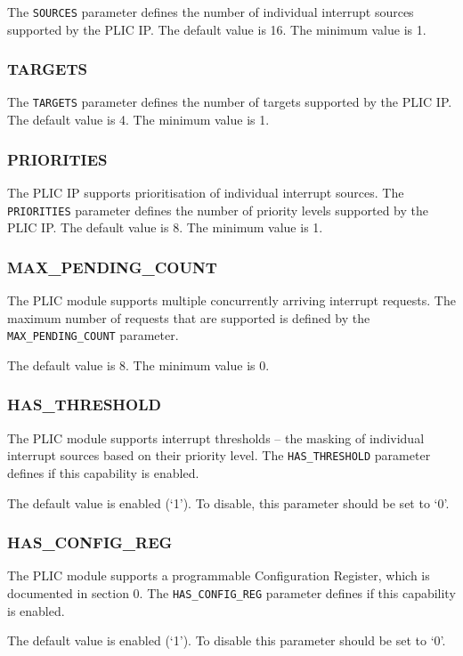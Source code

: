 The \texttt{SOURCES} parameter defines the number of individual
interrupt sources supported by the PLIC IP. The default value is 16. The
minimum value is 1.

\hypertarget{TARGETS}{\subsubsection{TARGETS}\label{sec:TARGETS}}

The \texttt{TARGETS} parameter defines the number of targets supported
by the PLIC IP. The default value is 4. The minimum value is 1.

\subsubsection{PRIORITIES}

\sloppy
The PLIC IP supports prioritisation of individual interrupt sources. The \texttt{PRIORITIES} parameter defines the number of priority levels supported by the PLIC IP. The default value is 8. The minimum value is 1.

\subsubsection{MAX\_PENDING\_COUNT}

\sloppy
The PLIC module supports multiple concurrently arriving interrupt
requests. The maximum number of requests that are supported is defined
by the \texttt{MAX\_PENDING\_COUNT} parameter.

The default value is 8. The minimum value is 0.

\subsubsection{HAS\_THRESHOLD}

The PLIC module supports interrupt thresholds -- the masking of
individual interrupt sources based on their priority level. The
\texttt{HAS\_THRESHOLD} parameter defines if this capability is enabled.

The default value is enabled (`1'). To disable, this parameter should be
set to `0'.

\subsubsection{HAS\_CONFIG\_REG}

The PLIC module supports a programmable Configuration Register, which is
documented in section 0. The \texttt{HAS\_CONFIG\_REG} parameter defines
if this capability is enabled.

The default value is enabled (`1'). To disable this parameter should be
set to `0'.
